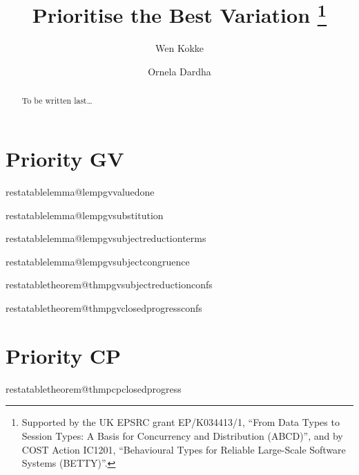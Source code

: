 \documentclass[citecolor=red,linkcolor=blue,runningheads]{llncs}
\makeatletter
\newcommand{\onlyinsubfile}[1]{#1}
\newcommand{\notinsubfile}[1]{}
\newcommand{\restatetheorem}[1]{%
  \begingroup
  \renewcommand{\thetheorem}{\ref{#1}}%
  \expandafter\expandafter\expandafter\theorem
  \csname restatabletheorem@#1\endcsname
  \endtheorem
  \endgroup
}
\newcommand{\restatelemma}[1]{%
  \begingroup
  \renewcommand{\thelemma}{\ref{#1}}%
  \expandafter\expandafter\expandafter\lemma
  \csname restatablelemma@#1\endcsname
  \endlemma
  \endgroup
}
\makeatother
\begin{document}
%
\renewcommand{\onlyinsubfile}[1]{}
\renewcommand{\notinsubfile}[1]{#1}
%
\title{Prioritise the Best Variation
\thanks{Supported by the UK EPSRC grant EP/K034413/1, ``From Data Types to Session Types: A Basis for Concurrency and Distribution (ABCD)'', and by COST Action IC1201, ``Behavioural Types for Reliable Large-Scale Software Systems (BETTY)''.}
}
%
\author{
  Wen Kokke%
  \and%
  Ornela Dardha%
  }
%
%
%
\maketitle
%
\begin{abstract}
To be written last\dots
{}
\end{abstract}








\appendix
\section{Priority GV}
{

  

  \restatelemma{lempgvvaluedone}
  

  \restatelemma{lempgvsubstitution}
  

  \restatelemma{lempgvsubjectreductionterms}
  

  \restatelemma{lempgvsubjectcongruence}
  

  \restatetheorem{thmpgvsubjectreductionconfs}
  

  \restatetheorem{thmpgvclosedprogressconfs}
  
}
\section{Priority CP}
{

  

  \restatetheorem{thmpcpclosedprogress}
  
}
\end{document}
